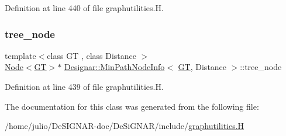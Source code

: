 Definition at line 440 of file graphutilities.\+H.

\mbox{\label{class_designar_1_1_min_path_node_info_a0121695ed8523a60ee92375767a5c169}} 
\subsubsection{\texorpdfstring{tree\+\_\+node}{tree\_node}}
{\footnotesize\ttfamily template$<$class GT , class Distance $>$ \\
\hyperlink{namespace_designar_a5af326c65aa2bd26b26c410f2030d09e}{Node}$<$\hyperlink{demo-buildgraph_8_c_a3001c40d2c31ca87ed96cd7d1334a55e}{GT}$>$$\ast$ \hyperlink{class_designar_1_1_min_path_node_info}{Designar\+::\+Min\+Path\+Node\+Info}$<$ \hyperlink{demo-buildgraph_8_c_a3001c40d2c31ca87ed96cd7d1334a55e}{GT}, Distance $>$\+::tree\+\_\+node}



Definition at line 439 of file graphutilities.\+H.



The documentation for this class was generated from the following file\+:\begin{DoxyCompactItemize}
\item 
/home/julio/\+De\+S\+I\+G\+N\+A\+R-\/doc/\+De\+Si\+G\+N\+A\+R/include/\hyperlink{graphutilities_8_h}{graphutilities.\+H}\end{DoxyCompactItemize}
